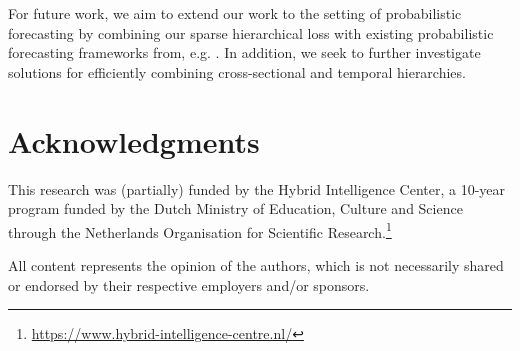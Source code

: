 \documentclass[preprint, 3p, times, twocolumn]{elsarticle}
\begin{document}
  For future work, we aim to extend our work to the setting of probabilistic forecasting by combining our sparse hierarchical loss with existing probabilistic forecasting frameworks from, e.g. \cite{sprangers_probabilistic_2021, hasson_probabilistic_2021, stankeviciute_conformal_2021}. In addition, we seek to further investigate solutions for efficiently combining cross-sectional and temporal hierarchies.

\section*{Acknowledgments}
  This research was (partially) funded by the Hybrid Intelligence Center, a 10-year program funded by the Dutch Ministry of Education, Culture and Science through the Netherlands Organisation for Scientific Research.\footnote{\url{https://www.hybrid-intelligence-centre.nl/}}

  All content represents the opinion of the authors, which is not necessarily shared or endorsed by their respective employers and/or sponsors.
  


 


\clearpage

\appendix
\onecolumn
\end{document}
